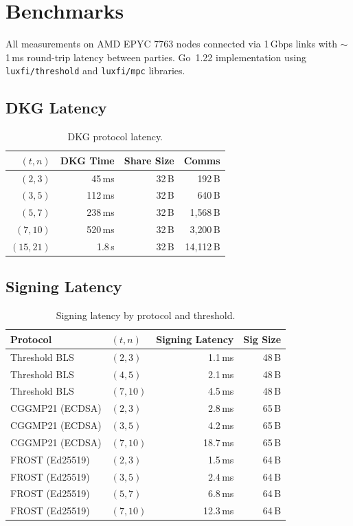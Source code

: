 \section{Benchmarks}

\label{sec:benchmarks}

All measurements on AMD EPYC 7763 nodes connected via 1\,Gbps links with
$\sim$1\,ms round-trip latency between parties. Go~1.22 implementation using
\texttt{luxfi/threshold} and \texttt{luxfi/mpc} libraries.

\subsection{DKG Latency}

\begin{table}[ht]
\centering
\caption{DKG protocol latency.}
\label{tab:dkg-benchmarks}
\begin{tabular}{rrrr}
\toprule
\textbf{$(t, n)$} & \textbf{DKG Time} & \textbf{Share Size} & \textbf{Comms} \\
\midrule
$(2, 3)$ & 45\,ms & 32\,B & 192\,B \\
$(3, 5)$ & 112\,ms & 32\,B & 640\,B \\
$(5, 7)$ & 238\,ms & 32\,B & 1{,}568\,B \\
$(7, 10)$ & 520\,ms & 32\,B & 3{,}200\,B \\
$(15, 21)$ & 1.8\,s & 32\,B & 14{,}112\,B \\
\bottomrule
\end{tabular}
\end{table}

\subsection{Signing Latency}

\begin{table}[ht]
\centering
\caption{Signing latency by protocol and threshold.}
\label{tab:signing-benchmarks}
\begin{tabular}{llrr}
\toprule
\textbf{Protocol} & \textbf{$(t, n)$} & \textbf{Signing Latency} & \textbf{Sig Size} \\
\midrule
Threshold BLS & $(2, 3)$ & 1.1\,ms & 48\,B \\
Threshold BLS & $(4, 5)$ & 2.1\,ms & 48\,B \\
Threshold BLS & $(7, 10)$ & 4.5\,ms & 48\,B \\
\midrule
CGGMP21 (ECDSA) & $(2, 3)$ & 2.8\,ms & 65\,B \\
CGGMP21 (ECDSA) & $(3, 5)$ & 4.2\,ms & 65\,B \\
CGGMP21 (ECDSA) & $(7, 10)$ & 18.7\,ms & 65\,B \\
\midrule
FROST (Ed25519) & $(2, 3)$ & 1.5\,ms & 64\,B \\
FROST (Ed25519) & $(3, 5)$ & 2.4\,ms & 64\,B \\
FROST (Ed25519) & $(5, 7)$ & 6.8\,ms & 64\,B \\
FROST (Ed25519) & $(7, 10)$ & 12.3\,ms & 64\,B \\
\bottomrule
\end{tabular}
\end{table}

